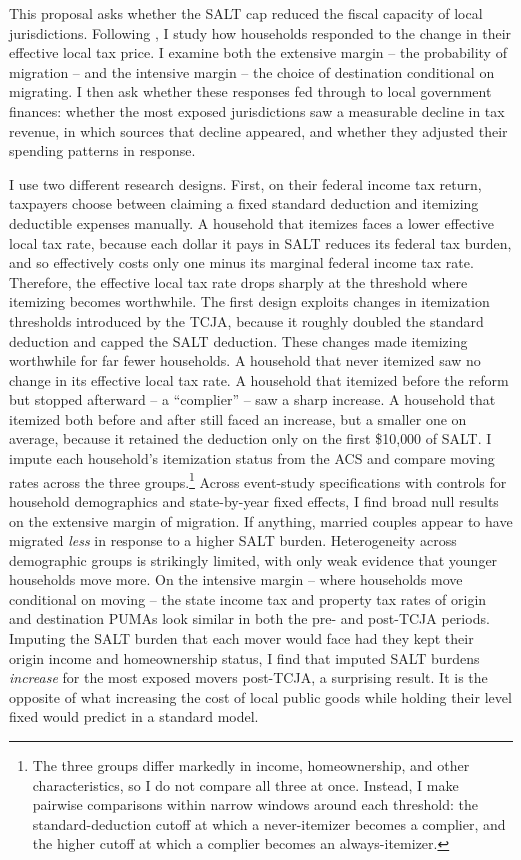 \documentclass[12pt]{article}
\begin{document}
This proposal asks whether the SALT cap reduced the fiscal capacity of local jurisdictions. Following \citet{Tiebout1956}, I study how households responded to the change in their effective local tax price. I examine both the extensive margin -- the probability of migration -- and the intensive margin -- the choice of destination conditional on migrating. I then ask whether these responses fed through to local government finances: whether the most exposed jurisdictions saw a measurable decline in tax revenue, in which sources that decline appeared, and whether they adjusted their spending patterns in response.

I use two different research designs. First, on their federal income tax return, taxpayers choose between claiming a fixed standard deduction and itemizing deductible expenses manually. A household that itemizes faces a lower effective local tax rate, because each dollar it pays in SALT reduces its federal tax burden, and so effectively costs only one minus its marginal federal income tax rate. Therefore, the effective local tax rate drops sharply at the threshold where itemizing becomes worthwhile. The first design exploits changes in itemization thresholds introduced by the TCJA, because it roughly doubled the standard deduction and capped the SALT deduction. These changes made itemizing worthwhile for far fewer households. A household that never itemized saw no change in its effective local tax rate. A household that itemized before the reform but stopped afterward -- a ``complier'' -- saw a sharp increase. A household that itemized both before and after still faced an increase, but a smaller one on average, because it retained the deduction only on the first \$10{,}000 of SALT. I impute each household's itemization status from the ACS and compare moving rates across the three groups.\footnote{The three groups differ markedly in income, homeownership, and other characteristics, so I do not compare all three at once. Instead, I make pairwise comparisons within narrow windows around each threshold: the standard-deduction cutoff at which a never-itemizer becomes a complier, and the higher cutoff at which a complier becomes an always-itemizer.} Across event-study specifications with controls for household demographics and state-by-year fixed effects, I find broad null results on the extensive margin of migration. If anything, married couples appear to have migrated \emph{less} in response to a higher SALT burden. Heterogeneity across demographic groups is strikingly limited, with only weak evidence that younger households move more. On the intensive margin -- where households move conditional on moving -- the state income tax and property tax rates of origin and destination PUMAs look similar in both the pre- and post-TCJA periods. Imputing the SALT burden that each mover would face had they kept their origin income and homeownership status, I find that imputed SALT burdens \emph{increase} for the most exposed movers post-TCJA, a surprising result. It is the opposite of what increasing the cost of local public goods while holding their level fixed would predict in a standard model.
\end{document}
